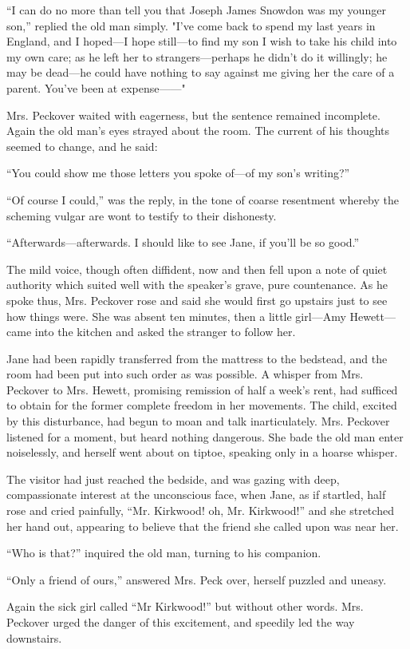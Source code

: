 ``I can do no more than tell you that Joseph James Snowdon was my
younger son,'' replied the old man simply. "I've come back to spend my
last years in England, and I hoped---I hope still---to find my son {}I
wish to take his child into my own care; as he left her to
strangers---perhaps he didn't do it willingly; he may be dead---he could
have nothing to say against me giving her the care of a parent. You've
been at expense{{------}}"

Mrs. Peckover waited with eagerness, but the sentence remained
incomplete. Again the old man's eyes strayed about the room. The current
of his thoughts seemed to change, and he said:

``You could show me those letters you spoke of---of my son's writing?''

``Of course I could,'' was the reply, in the tone of coarse resentment
whereby the scheming vulgar are wont to testify to their dishonesty.

``Afterwards---afterwards. I should like to see Jane, if you'll be so
good.''

The mild voice, though often diffident, now and then fell upon a note of
quiet authority which suited well with the speaker's grave, pure
countenance. As he spoke thus, Mrs. Peckover rose and said she would
first go upstairs just to see how things were. She was {}absent ten
minutes, then a little girl---Amy Hewett---came into the kitchen and
asked the stranger to follow her.

Jane had been rapidly transferred from the mattress to the bedstead, and
the room had been put into such order as was possible. A whisper from
Mrs. Peckover to Mrs. Hewett, promising remission of half a week's rent,
had sufficed to obtain for the former complete freedom in her movements.
The child, excited by this disturbance, had begun to moan and talk
inarticulately. Mrs. Peckover listened for a moment, but heard nothing
dangerous. She bade the old man enter noiselessly, and herself went
about on tiptoe, speaking only in a hoarse whisper.

The visitor had just reached the bedside, and was gazing with deep,
compassionate interest at the unconscious face, when Jane, as if
startled, half rose and cried painfully, ``Mr. Kirkwood! oh, Mr.
Kirkwood!'' and she stretched her hand out, appearing to believe that
the friend she called upon was near her.

{}``Who is that?'' inquired the old man, turning to his companion.

``Only a friend of ours,'' answered Mrs. Peck over, herself puzzled and
uneasy.

Again the sick girl called ``Mr Kirkwood!'' but without other words.
Mrs. Peckover urged the danger of this excitement, and speedily led the
way downstairs.
